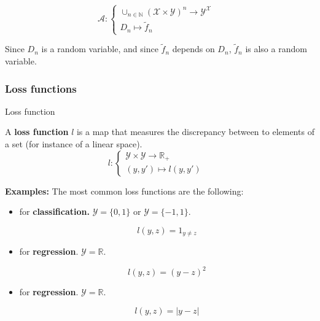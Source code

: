 \documentclass[
10pt, %
a4paper, %
oneside, %
headinclude,footinclude, %
BCOR5mm, %
]{scrartcl}
\begin{document}
$$
\mathcal{A}  : \left\{
    \begin{array}{ll}
	\cup_{n\in \mathbb{N} } ( \mathcal{X} \times \mathcal{Y} )^n\rightarrow \mathcal{Y}^{ \mathcal{X} } & \\
        D_n \mapsto \tilde{f}_n& 
    \end{array}
\right.
$$

Since $D_n$ is a random variable, and since $ \tilde{f}_n$ depends on $D_n$, $ \tilde{f}_n$ is also a random variable.

\subsubsection{\large\color{Periwinkle}Loss functions}

\begin{definition}{Loss function}

    A \textbf{{loss function}} $l$ is a map that measures the discrepancy between to elements of a set (for instance of a linear space).
$$
l: \left\{
    \begin{array}{ll}
	\mathcal{Y} \times \mathcal{Y} \rightarrow \mathbb{R}_+ & \\
	(y,y') \mapsto l(y,y')& 
    \end{array}
\right.
$$

\end{definition}

\textbf{{Examples:}} The most common loss functions are the following:
\begin{itemize}
    \item["0-1" loss] for \textbf{{classification.}} $ \mathcal{Y}  = \{0, 1\}$ or $ \mathcal{Y}  = \{-1, 1\}$.

	\begin{equation}
	    l(y,z) = 1_{y\neq z}
	\end{equation}
    \item[square loss] for \textbf{{regression}}. $ \mathcal{Y}  = \mathbb{R} $. 

	\begin{equation}
	    l(y,z) = (y-z)^2
	\end{equation}
    \item[absolute loss] for \textbf{{regression}}. $ \mathcal{Y}  = \mathbb{R} $. 

	\begin{equation}
	    l(y,z) = |y-z|
	\end{equation}
\end{itemize}
\end{document}
